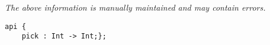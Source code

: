 \label{pkg:prime\_sizes}

{\tiny \it The above information is manually maintained and may contain errors.}
\begin{verbatim}
api {
    pick : Int -> Int;};
\end{verbatim}
